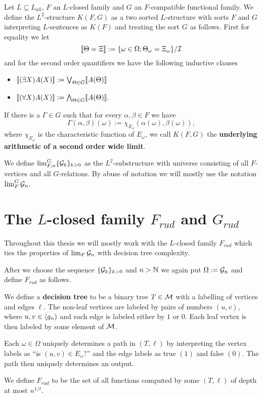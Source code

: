 \begin{defi}
Let $L\subseteq L_{all}$, $F$ an $L$-closed family and $G$ an $F$-compatible functional family. We define the $L^2$-structure $K(F,G)$ as a two sorted $L$-structure with sorts $F$ and $G$ interpreting $L$-sentences as $K(F)$ and treating the sort $G$ as follows. First for equality we let
\[\llbracket\Theta=\Xi \rrbracket := \{\omega\in \Omega;\Theta_\omega=\Xi_\omega\}/\mathcal{I}\]
and for the second order quantifiers we have the following inductive clauses
\begin{itemize}
\item $\llbracket(\exists X)A(X)\rrbracket:=\bigvee_{\Theta\in G}\llbracket A(\Theta)\rrbracket$
\item $\llbracket(\forall X)A(X)\rrbracket:=\bigwedge_{\Theta\in G}\llbracket A(\Theta)\rrbracket.$
\end{itemize}

If there is a $\Gamma\in G$ such that for every $\alpha,\beta\in F$ we have
\[\Gamma(\alpha,\beta)(\omega):=\chi_{E_\omega}(\alpha(\omega),\beta(\omega)),\]
where $\chi_{E_\omega}$ is the characteristic function of $E_\omega$, we call $K(F,G)$ the \textbf{underlying arithmetic of a second order wide limit}.

We define $\lim_{F,n}^G\{\mathcal{G}_k\}_{k>0}$ as the $L^2$-substructure with universe consisting of all $F$-vertices and all $G$-relations. By abuse of notation we will mostly use the notation $\lim_F^G\mathcal{G}_n$.
\end{defi}
 
\section{The $L$-closed family $F_{rud}$ and $G_{rud}$}\label{secFrud}

Throughout this thesis we will mostly work with the $L$-closed family $F_{rud}$ which ties the properties of $\lim_F \mathcal{G}_n$ with decision tree complexity.

After we choose the sequence $\{\mathcal{G}_k\}_{k>0}$ and $n>\mathbb{N}$ we again put $\Omega:=\mathcal{G}_n$ and define $F_{rud}$ as follows.

\begin{defi}
We define a \textbf{decision tree} to be a binary tree $T\in\mathcal{M}$ with a labelling of vertices and edges $\ell$. The non-leaf vertices are labeled by pairs of numbers $(u,v)$, where $u,v\in\langle g_n)$ and each edge is labeled either by $1$ or $0$. Each leaf vertex is then labeled by some element of $\mathcal{M}$.

Each $\omega\in\Omega$ uniquely determines a path in $(T,\ell)$ by interpreting the vertex labels as ``is $(u,v)\in E_\omega$?'' and the edge labels as true $(1)$ and false $(0)$. The path then uniquely determines an output.

We define $F_{rud}$ to be the set of all functions computed by some $(T,\ell)$ of depth at most $n^{1/t}$.
\end{defi}

